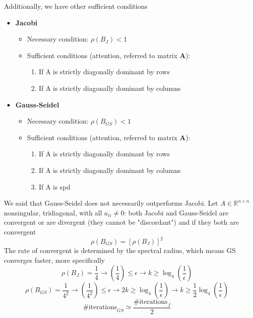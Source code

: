     Additionally, we have other sufficient conditions
    \begin{itemize}
        \item \textbf{Jacobi}
        \begin{itemize}
            \item Necessary condition: $\rho(B_J)<1$
            \item Sufficient conditions (attention, referred to matrix \textbf{A}):
            \begin{enumerate}
                \item If A is strictly diagonally dominant by rows
                \item If A is strictly diagonally dominant by columns
            \end{enumerate}
        \end{itemize}
        \item \textbf{Gauss-Seidel}
        \begin{itemize}
            \item Necessary condition: $\rho(B_{GS})<1$
            \item Sufficient conditions (attention, referred to matrix \textbf{A}):
            \begin{enumerate}
                \item If A is strictly diagonally dominant by rows
                \item If A is strictly diagonally dominant by columns
                \item If A is spd
            \end{enumerate}
        \end{itemize}
    \end{itemize}
    We said that Gauss-Seidel does not necessarily outperforms Jacobi. Let $A\in\mathbb{R}^{n\times n}$ nonsingular, tridiagonal, with all $a_{ii}\neq 0$: both Jacobi and Gauss-Seidel are convergent or are divergent (they cannot be "discordant") and if they both are convergent
    $$
    \rho(B_{GS})=\left[\rho(B_J)\right]^2
    $$
    The rate of convergent is determined by the spectral radius, which means GS converges faster, more specifically
    $$
    \rho(B_J)=\frac{1}{4}\rightarrow \left(
        \frac{1}{4}
    \right)\leq \epsilon
    \rightarrow k\geq \log_4\left(\frac{1}{\epsilon}\right)
    $$
    $$
    \rho(B_{GS})=\frac{1}{4^2}\rightarrow \left(
        \frac{1}{4^2}
    \right)\leq \epsilon
    \rightarrow 2k\geq \log_4\left(\frac{1}{\epsilon}\right)
    \rightarrow k\geq \frac{1}{2}\log_4\left(\frac{1}{\epsilon}\right)
    $$
    $$
    \text{\#iterations}_{GS}\simeq
    \frac{\text{\#iterations}_{J}}{2}
    $$

